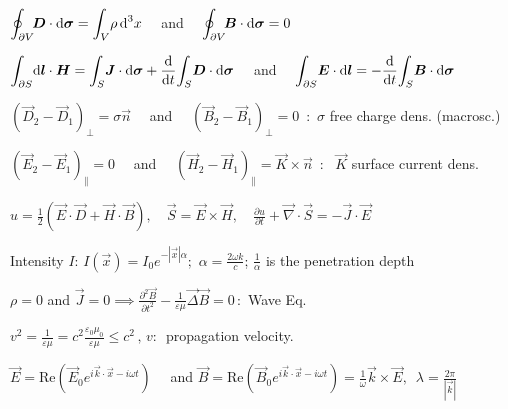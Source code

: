 \begin{squishlist}
\item $\displaystyle{\oint_{\partial V}} \! \mbox{\boldmath$D$}\cdot\mbox{\boldmath$\textrm{d} \sigma$} = \displaystyle{\int_V} \rho \, \textrm{d} ^3x \quad$ and $\quad \displaystyle{\oint_{\partial V}} \! \mbox{\boldmath$B$}\cdot\mbox{\boldmath$\textrm{d} \sigma$} = 0$

\item $\displaystyle{\int_{\partial S}} \mbox{\boldmath$\textrm{d} l$}\cdot\mbox{\boldmath$H$} = \displaystyle{\int_S} \mbox{\boldmath$J$}\cdot\mbox{\boldmath$\textrm{d} \sigma$} + \frac{\textrm{d} }{\textrm{d} t} \displaystyle{\int_S} \mbox{\boldmath$D$}\cdot\mbox{\boldmath$\textrm{d} \sigma$} \quad $ and  $\quad \displaystyle{\int_{\partial S }} \mbox{\boldmath$E$} \cdot \mbox{\boldmath$\textrm{d} l$} = -\frac{\textrm{d} }{\textrm{d} t} \displaystyle{\int_S} \mbox{\boldmath$B$} \cdot \mbox{\boldmath$\textrm{d} \sigma$}$

\item $(\vec{D}_2 - \vec{D}_1)_{\perp} = \sigma \vec{n} \quad$ and  $\quad (\vec{B}_2 - \vec{B}_1)_{\perp} = 0 \,$ :\, $\sigma$ free charge dens. (macrosc.)

\item $(\vec{E}_2 - \vec{E}_1)_{\parallel} = 0 \quad $ and  $\quad (\vec{H}_2 - \vec{H}_1)_{\parallel} = \vec{K} \times \vec{n} \,$ : \, $\vec{K}$ surface current dens.
\end{squishlist}
\begin{squishlist}

\item $u = \frac{1}{2}(\vec{E}\cdot\vec{D} + \vec{H}\cdot\vec{B}), \quad \vec{S} = \vec{E} \times \vec{H}, \quad \frac{\partial u}{\partial t} + \vec{\nabla}\cdot\vec{S} = - \vec{J}\cdot\vec{E}$

\item Intensity $I$: $I(\vec{x})=I_0e^{-|\vec{x}|\alpha}; $ $\alpha=\frac{2\omega k}{c}$; $ \frac{1}{\alpha}$ is the penetration depth
\end{squishlist}
\begin{squishlist}
\item $\rho = 0$ and  $\vec{J} = 0  \implies  \frac{\partial^2 \vec{B}}{\partial t^2} - \frac{1}{\varepsilon \mu} \vec{\Delta}\vec{B}=0 \, :$  Wave Eq.

\item $v^2 = \frac{1}{\varepsilon\mu} = c^2 \frac{\varepsilon_0\mu_0}{\varepsilon \mu} \leq c^2 \, , \, v : \,$ propagation velocity. 

\item $\vec{E} = \text{Re}\left(\vec{E}_0 e^{i\vec{k}\cdot\vec{x} - i\omega t}\right) \quad $ and  $\vec{B} = \text{Re}\left(\vec{B}_0 e^{i\vec{k}\cdot\vec{x} - i\omega t}\right) = \frac{1}{\omega} \vec{k}\times\vec{E} , \, $  $\lambda = \frac{2\pi}{|\vec{k}|}$
\end{squishlist}


